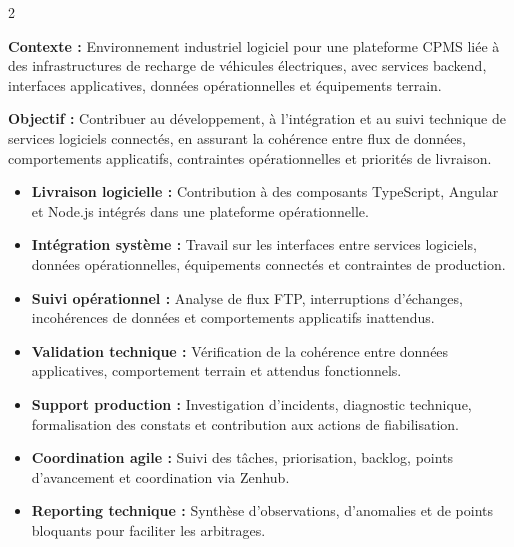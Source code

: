 \documentclass[8pt,a4paper,ragged2e,withhyper]{altacv}
\begin{document}



\makecvheader
\vspace{-0.3cm}


\begin{paracol}{2}



\textbf{Contexte :} Environnement industriel logiciel pour une plateforme CPMS liée à des infrastructures de recharge de véhicules électriques, avec services backend, interfaces applicatives, données opérationnelles et équipements terrain.

\textbf{Objectif :} Contribuer au développement, à l’intégration et au suivi technique de services logiciels connectés, en assurant la cohérence entre flux de données, comportements applicatifs, contraintes opérationnelles et priorités de livraison.

\begin{itemize}
  \item \textbf{Livraison logicielle :} Contribution à des composants TypeScript, Angular et Node.js intégrés dans une plateforme opérationnelle.
  \item \textbf{Intégration système :} Travail sur les interfaces entre services logiciels, données opérationnelles, équipements connectés et contraintes de production.
  \item \textbf{Suivi opérationnel :} Analyse de flux FTP, interruptions d’échanges, incohérences de données et comportements applicatifs inattendus.
  \item \textbf{Validation technique :} Vérification de la cohérence entre données applicatives, comportement terrain et attendus fonctionnels.
  \item \textbf{Support production :} Investigation d’incidents, diagnostic technique, formalisation des constats et contribution aux actions de fiabilisation.
  \item \textbf{Coordination agile :} Suivi des tâches, priorisation, backlog, points d’avancement et coordination via Zenhub.
  \item \textbf{Reporting technique :} Synthèse d’observations, d’anomalies et de points bloquants pour faciliter les arbitrages.
\end{itemize}


\end{paracol}
\end{document}
